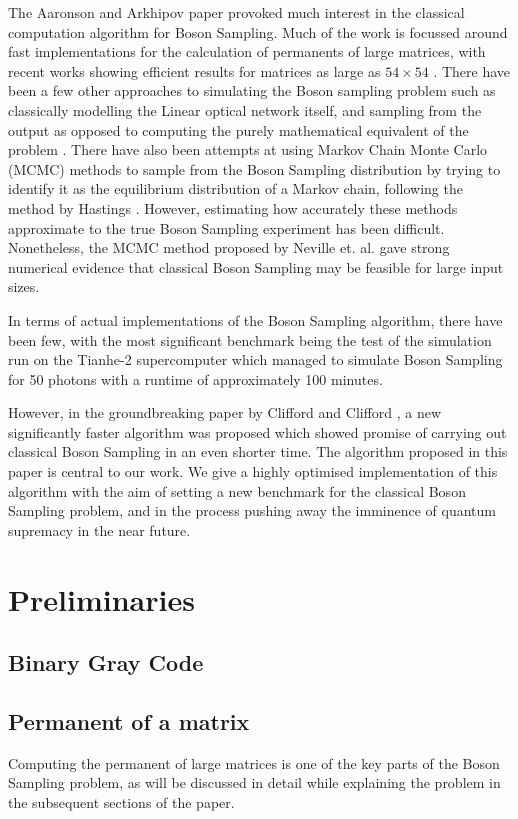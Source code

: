 \documentclass[11pt]{article}
\theoremstyle{theorem}
\theoremstyle{remark}
\theoremstyle{plain}
\theoremstyle{definition}
\begin{document}
The Aaronson and Arkhipov paper provoked much interest in the classical computation algorithm for Boson Sampling. Much of the work is focussed around fast implementations for the calculation of permanents of large matrices, with recent works showing efficient results for matrices as large as $54 \times 54$ \cite{roga2019, lundow2019}. There have been a few other approaches to simulating the Boson sampling problem such as classically modelling the Linear optical network itself, and sampling from the output as opposed to computing the purely mathematical equivalent of the problem \cite{rahimi2016}. There have also been attempts at using Markov Chain Monte Carlo (MCMC) methods to sample from the Boson Sampling distribution by trying to identify it as the equilibrium distribution of a Markov chain, following the method by Hastings \cite{hastings1970}. However, estimating how accurately these methods approximate to the true Boson Sampling experiment has been difficult. Nonetheless, the MCMC method proposed by Neville et. al. \cite{neville2017} gave strong numerical evidence that classical Boson Sampling may be feasible for large input sizes.

In terms of actual implementations of the Boson Sampling algorithm, there have been few, with the most significant benchmark being the test of the simulation run on the Tianhe-2 supercomputer \cite{wu2018} which managed to simulate Boson Sampling for 50 photons with a runtime of approximately 100 minutes.

However, in the groundbreaking paper by Clifford and Clifford \cite{clifford17}, a new significantly faster algorithm was proposed which showed promise of carrying out classical Boson Sampling in an even shorter time. The algorithm proposed in this paper is central to our work. We give a highly optimised implementation of this algorithm with the aim of setting a new benchmark for the classical Boson Sampling problem, and in the process pushing away the imminence of quantum supremacy in the near future.

\section{Preliminaries}
\subsection{Binary Gray Code} \label{sec:gray_code}

\subsection{Permanent of a matrix} \label{sec:permanent}
Computing the permanent of large matrices is one of the key parts of the Boson Sampling problem, as will be discussed in detail while explaining the problem in the subsequent sections of the paper.
\end{document}
